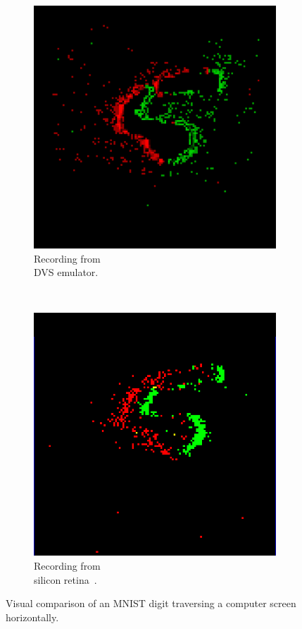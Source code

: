 \documentclass[conference]{IEEEtran}
\begin{document}
\begin{figure}[htb]
  \centering
  \begin{subfigure}[b]{0.21\textwidth}
    \includegraphics[width=\textwidth]{camera_demo_1}
    \caption{Recording from \\DVS emulator. }
    \label{fig:cam_demo}
  \end{subfigure}~
  \begin{subfigure}[b]{0.21\textwidth}
    \includegraphics[width=\textwidth]{dvs_demo}
    \caption{Recording from \\silicon retina~\cite{bernabeDVS}.}
    \label{fig:dvs_demo}
  \end{subfigure}
  
  \caption{Visual comparison of an MNIST digit traversing a computer screen horizontally.}
  \label{fig:dvs_vs_cam}
  
\end{figure}
\end{document}
